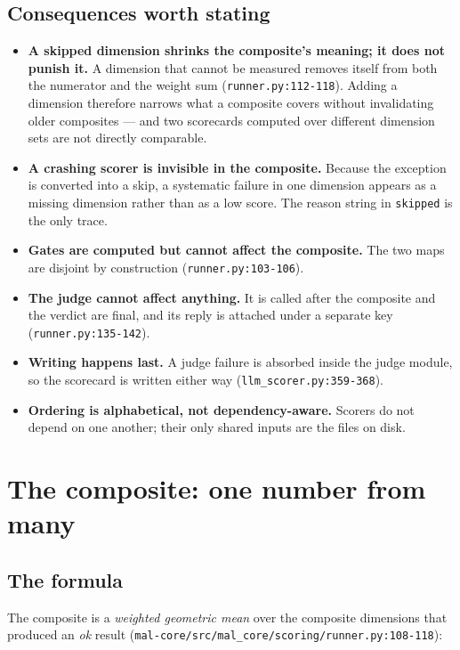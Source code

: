 \documentclass[11pt,a4paper]{article}
\newcommand{\code}[1]{\texttt{#1}}
\begin{document}
\subsection{Consequences worth stating}

\begin{itemize}
\item \textbf{A skipped dimension shrinks the composite's meaning; it does
      not punish it.} A dimension that cannot be measured removes itself
      from both the numerator and the weight sum (\code{runner.py:112-118}).
      Adding a dimension therefore narrows what a composite covers without
      invalidating older composites --- and two scorecards computed over
      different dimension sets are not directly comparable.
\item \textbf{A crashing scorer is invisible in the composite.} Because the
      exception is converted into a skip, a systematic failure in one
      dimension appears as a missing dimension rather than as a low score.
      The reason string in \code{skipped} is the only trace.
\item \textbf{Gates are computed but cannot affect the composite.} The two
      maps are disjoint by construction (\code{runner.py:103-106}).
\item \textbf{The judge cannot affect anything.} It is called after the
      composite and the verdict are final, and its reply is attached under a
      separate key (\code{runner.py:135-142}).
\item \textbf{Writing happens last.} A judge failure is absorbed inside the
      judge module, so the scorecard is written either way
      (\code{llm\_scorer.py:359-368}).
\item \textbf{Ordering is alphabetical, not dependency-aware.} Scorers do
      not depend on one another; their only shared inputs are the files on
      disk.
\end{itemize}

\section{The composite: one number from many}
\label{sec:composite}

\subsection{The formula}

The composite is a \emph{weighted geometric mean} over the composite
dimensions that produced an \emph{ok} result
(\code{mal-core/src/mal\_core/scoring/runner.py:108-118}):
\end{document}
